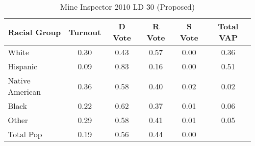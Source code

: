 \begin{table}[htb]
\begin{center}
\caption{Mine Inspector 2010 LD 30 (Proposed)}
\label{smine_vap_ld_30}
\begin{tabular}{lccccc}
  \hline
Racial Group & Turnout & D Vote & R Vote & S Vote & Total VAP \\ 
  \hline
White & 0.30 & 0.43 & 0.57 & 0.00 & 0.36 \\ 
  Hispanic & 0.09 & 0.83 & 0.16 & 0.00 & 0.51 \\ 
  Native American & 0.36 & 0.58 & 0.40 & 0.02 & 0.02 \\ 
  Black & 0.22 & 0.62 & 0.37 & 0.01 & 0.06 \\ 
  Other & 0.29 & 0.58 & 0.41 & 0.01 & 0.05 \\ 
  Total Pop & 0.19 & 0.56 & 0.44 & 0.00 &  \\ 
   \hline
\end{tabular}
\end{center}
\end{table}
